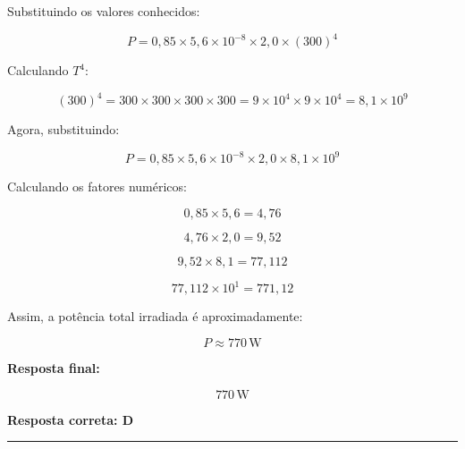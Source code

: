 \documentclass[a4paper,12pt]{article}
\begin{document}
\begin{flushleft}
\bigskip

Substituindo os valores conhecidos:

\[
P = 0,85 \times 5,6 \times 10^{-8} \times 2,0 \times (300)^4
\]

\bigskip

Calculando $T^4$:

\[
(300)^4 = 300 \times 300 \times 300 \times 300 = 9 \times 10^4 \times 9 \times 10^4 = 8,1 \times 10^9
\]

\bigskip

Agora, substituindo:

\[
P = 0,85 \times 5,6 \times 10^{-8} \times 2,0 \times 8,1 \times 10^9
\]

\bigskip

Calculando os fatores numéricos:

\[
0,85 \times 5,6 = 4,76
\]

\[
4,76 \times 2,0 = 9,52
\]

\[
9,52 \times 8,1 = 77,112
\]

\[
77,112 \times 10^1 = 771,12
\]

\bigskip

Assim, a potência total irradiada é aproximadamente:

\[
P \approx 770 \, \text{W}
\]

\bigskip

\textbf{Resposta final:}

\[
\boxed{770 \, \text{W}}
\]

\textbf{Resposta correta: \colorbox{green!50}{D}}

\end{flushleft}
\noindent\rule{\linewidth}{0.6pt}\\
\end{document}
